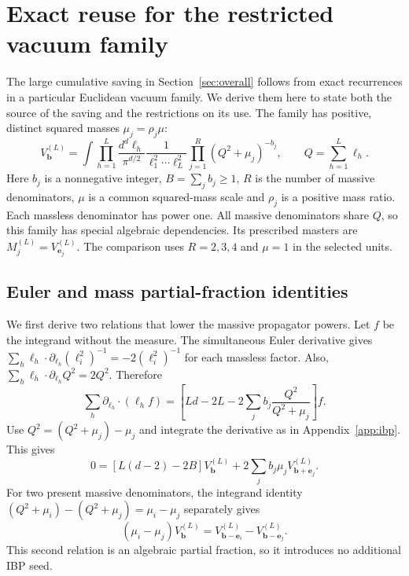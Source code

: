 \section{Exact reuse for the restricted vacuum family}
\label{app:vacuum}
The large cumulative saving in Section~\ref{sec:overall} follows from exact recurrences in a particular Euclidean vacuum family. We derive them here to state both the source of the saving and the restrictions on its use. The family has positive, distinct squared masses $\mu_j=\rho_j\mu$:
\begin{equation}
 V^{(L)}_{\boldsymbol b}=
 \int\prod_{h=1}^L\frac{d^d\ell_h}{\pi^{d/2}}
 \frac{1}{\ell_1^2\cdots\ell_L^2}
 \prod_{j=1}^{R}(Q^2+\mu_j)^{-b_j},
 \qquad Q=\sum_{h=1}^L\ell_h.
 \label{eq:vacuum}
\end{equation}
Here $b_j$ is a nonnegative integer, $B=\sum_jb_j\geq1$, $R$ is the number of massive denominators, $\mu$ is a common squared-mass scale and $\rho_j$ is a positive mass ratio. Each massless denominator has power one. All massive denominators share $Q$, so this family has special algebraic dependencies. Its prescribed masters are $M_j^{(L)}=V^{(L)}_{\boldsymbol e_j}$. The comparison uses $R=2,3,4$ and $\mu=1$ in the selected units.

\subsection{Euler and mass partial-fraction identities}
We first derive two relations that lower the massive propagator powers. Let $f$ be the integrand without the measure. The simultaneous Euler derivative gives $\sum_h\ell_h\cdot\partial_{\ell_h}(\ell_i^2)^{-1}=-2(\ell_i^2)^{-1}$ for each massless factor. Also, $\sum_h\ell_h\cdot\partial_{\ell_h}Q^2=2Q^2$. Therefore
\begin{equation}
 \sum_h\partial_{\ell_h}\cdot(\ell_h f)
 =\left[Ld-2L-2\sum_jb_j\frac{Q^2}{Q^2+\mu_j}\right]f.
\end{equation}
Use $Q^2=(Q^2+\mu_j)-\mu_j$ and integrate the derivative as in Appendix~\ref{app:ibp}. This gives
\begin{equation}
 0=[L(d-2)-2B]V^{(L)}_{\boldsymbol b}
       +2\sum_j b_j\mu_jV^{(L)}_{\boldsymbol b+\boldsymbol e_j}.
 \label{eq:euler-vac}
\end{equation}
For two present massive denominators, the integrand identity
$(Q^2+\mu_i)-(Q^2+\mu_j)=\mu_i-\mu_j$ separately gives
\begin{equation}
 (\mu_i-\mu_j)V_{\boldsymbol b}^{(L)}
   =V_{\boldsymbol b-\boldsymbol e_i}^{(L)}
    -V_{\boldsymbol b-\boldsymbol e_j}^{(L)}.
 \label{eq:mass-vac}
\end{equation}
This second relation is an algebraic partial fraction, so it introduces no additional IBP seed.


